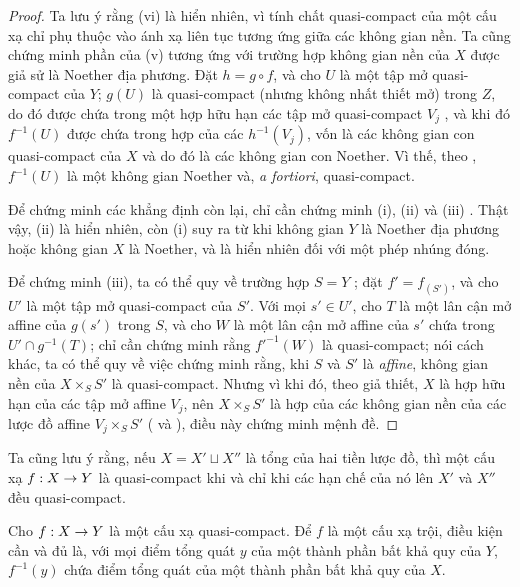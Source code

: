 \documentclass[oneside]{amsart}
\makeatletter
\newcommand{\ega@arrow}[2]{\mathchoice{#1}{#2}{#2}{#2}}
\renewcommand{\to}{\ega@arrow{\longrightarrow}{\rightarrow}}
\newcommand{\oldpage}[2][]{{\marginnote{\normalfont\textbf{#1}~|~#2}}\ignorespaces}
\let\EGAOriginalLabel\label
\renewcommand{\label}[1]{\phantomsection\EGAOriginalLabel{#1}}
\makeatother
\begin{document}
\begin{proof}
Ta lưu ý rằng (vi) là hiển nhiên, vì tính chất quasi-compact của một cấu xạ chỉ phụ thuộc vào ánh xạ liên tục tương ứng giữa các không gian nền.
Ta cũng chứng minh phần của (v) tương ứng với trường hợp không gian nền của $X$ được giả sử là Noether địa phương.
Đặt $h=g\circ f$, và cho $U$ là một tập mở quasi-compact của $Y$;
$g(U)$ là quasi-compact (nhưng không nhất thiết mở) trong $Z$, do đó được chứa trong một hợp hữu hạn các tập mở quasi-compact $V_j$ , và khi đó $f^{-1}(U)$ được chứa trong hợp của các $h^{-1}(V_j)$, vốn là các không gian con quasi-compact của $X$ và do đó là các không gian con Noether.
Vì thế, theo , $f^{-1}(U)$ là một không gian Noether và, \emph{a fortiori}, quasi-compact.

Để chứng minh các khẳng định còn lại, chỉ cần chứng minh (i), (ii) và (iii) .
Thật vậy, (ii) là hiển nhiên, còn (i) suy ra từ  khi không gian $Y$ là Noether địa phương hoặc không gian $X$ là Noether, và là hiển nhiên đối với một phép nhúng đóng.

Để chứng minh (iii),
\oldpage[I]{154}
ta có thể quy về trường hợp $S=Y$ ;
đặt $f'=f_{(S')}$, và cho $U'$ là một tập mở quasi-compact của $S'$.
Với mọi $s'\in U'$, cho $T$ là một lân cận mở affine của $g(s')$ trong $S$, và cho $W$ là một lân cận mở affine của $s'$ chứa trong $U'\cap g^{-1}(T)$;
chỉ cần chứng minh rằng $f'^{-1}(W)$ là quasi-compact;
nói cách khác, ta có thể quy về việc chứng minh rằng, khi $S$ và $S'$ là \emph{affine}, không gian nền của $X\times_S S'$ là quasi-compact.
Nhưng vì khi đó, theo giả thiết, $X$ là hợp hữu hạn của các tập mở affine $V_j$, nên $X\times_S S'$ là hợp của các không gian nền của các lược đồ affine $V_j\times_S S'$ ( và ), điều này chứng minh mệnh đề.
\end{proof}

Ta cũng lưu ý rằng, nếu $X=X'\sqcup X''$ là tổng của hai tiền lược đồ, thì một cấu xạ $f:X\to Y$ là quasi-compact khi và chỉ khi các hạn chế của nó lên $X'$ và $X''$ đều quasi-compact.

\begin{proposition}[6.6.5]
\label{I.6.6.5}
Cho $f:X\to Y$ là một cấu xạ quasi-compact.
Để $f$ là một cấu xạ trội, điều kiện cần và đủ là, với mọi điểm tổng quát $y$ của một thành phần bất khả quy của $Y$, $f^{-1}(y)$ chứa điểm tổng quát của một thành phần bất khả quy của $X$.
\end{proposition}
\end{document}
